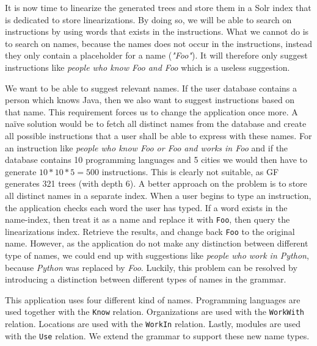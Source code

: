 It is now time to linearize the generated trees and store them in a Solr index that is dedicated to store linearizations. By doing so, we will be able to search on instructions by using words that exists in the instructions. What we cannot do is to search on names, because the names does not occur in the instructions, instead they only contain a placeholder for a name (\emph{"Foo"}). It will therefore only suggest instructions like \emph{people who know Foo and Foo} which is a useless suggestion.

We want to be able to suggest relevant names. If the user database contains a person which knows Java, then we also want to suggest instructions based on that name. This requirement forces us to change the application once more. 
\newline
\newline
A na{\"i}ve solution would be to fetch all distinct names from the database and create all possible instructions that a user shall be able to express with these names. For an instruction like \emph{people who know Foo or Foo and works in Foo} and if the database contains 10 programming languages and 5 cities we would then have to generate $10*10*5=500$ instructions. This is clearly not suitable, as GF generates 321 trees (with depth 6).
\newline
\newline
A better approach on the problem is to store all distinct names in a separate index. When a user begins to type an instruction, the application checks each word the user has typed. If a word exists in the name-index, then treat it as a name and replace it with \texttt{Foo}, then query the linearizations index. Retrieve the results, and change back \texttt{Foo} to the original name. However, as the application do not make any distinction between different type of names, we could end up with suggestions like \emph{people who work in Python}, because \emph{Python} was replaced by \emph{Foo}. Luckily, this problem can be resolved by introducing a distinction between different types of names in the grammar.


This application uses four different kind of names. Programming languages are used together with the \texttt{Know} relation. Organizations are used with the \texttt{WorkWith} relation. Locations are used with the \texttt{WorkIn} relation. Lastly, modules are used with the \texttt{Use} relation. We extend the grammar to support these new name types.

